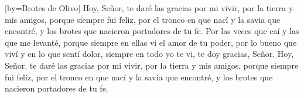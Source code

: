 [by={Brotes de Olivo}]
\beginverse
Hoy, Señor, te daré las gracias por mi vivir,
por la tierra y mis amigos, porque siempre fui feliz,
por el tronco en que nací y la savia que encontré,
y los brotes que nacieron portadores de tu fe.
\endverse
\beginchorus
Por las veces que caí y las que me levanté, 
porque siempre en ellas vi el amor de tu poder,
por lo bueno que viví y en lo que sentí dolor,
siempre en todo yo te vi, te doy gracias, Señor.
\endchorus
\beginverse
Hoy, Señor, te daré las gracias por mi vivir,
por la tierra y mis amigos, porque siempre fui feliz,
por el tronco en que nací y la savia que encontré,
y los brotes que nacieron portadores de tu fe.
\endverse
\endsong